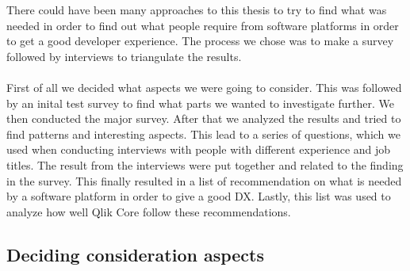 \documentclass{article}
\begin{document}
There could have been many approaches to this thesis to try to find what was needed in order to find out
what people require from software platforms in order to get a good developer experience. The process we chose was to make
a survey followed by interviews to triangulate the results.
\\ \\
First of all we decided what aspects we were going to consider. This was followed by an inital test survey to find what
parts we wanted to investigate further. We then conducted the major survey. After that we analyzed the results and tried to find
patterns and interesting aspects. This lead to a series of questions, which we used when conducting interviews with people with
different experience and job titles. The result from the interviews were put together and related to the finding in the survey.
This finally resulted in a list of recommendation on what is needed by a software platform in order to give a good DX.
Lastly, this list was used to analyze how well Qlik Core follow these recommendations.

\subsection{Deciding consideration aspects}
\end{document}
